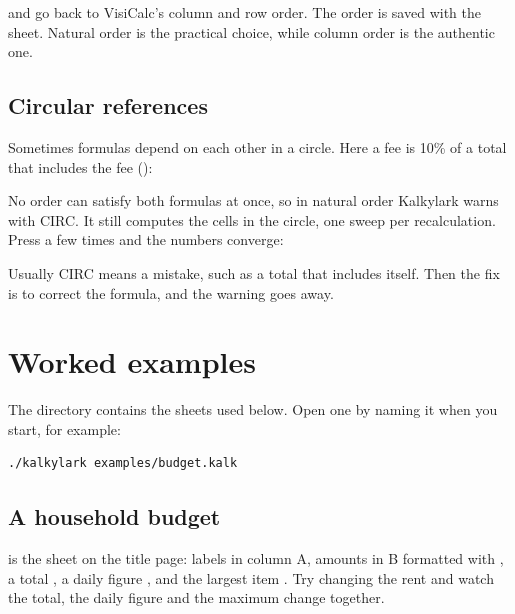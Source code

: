 \documentclass[11pt]{article}
\begin{document}

 and  go back to VisiCalc's column and row order. The
order is saved with the sheet. Natural order is the practical choice, while
column order is the authentic one.

\subsection{Circular references}

Sometimes formulas depend on each other in a circle. Here a fee is 10\% of
a total that includes the fee ():


No order can satisfy both formulas at once, so in natural order Kalkylark
warns with \textsf{CIRC}. It still computes the cells in the circle, one
sweep per recalculation. Press \typ{!} a few times and the numbers
converge:


Usually \textsf{CIRC} means a mistake, such as a total that includes
itself. Then the fix is to correct the formula, and the warning goes away.

\section{Worked examples}

The  directory contains the sheets used below. Open one by
naming it when you start, for example:

\begin{lstlisting}
./kalkylark examples/budget.kalk
\end{lstlisting}

\subsection{A household budget}

 is the sheet on the title page: labels in column
\textsf{A}, amounts in \textsf{B} formatted with , a total
, a daily figure , and the largest item
. Try changing the rent and watch the total, the daily
figure and the maximum change together.
\end{document}
